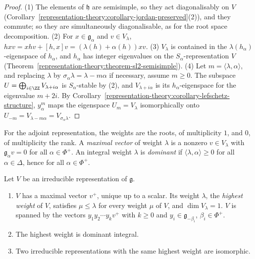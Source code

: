 \begin{proof}
(1) The elements of $\mathfrak{h}$ are semisimple, so they act diagonalisably on $V$ (Corollary~\ref{representation-theory:corollary-jordan-preserved}(2)), and they commute; so they
are simultaneously diagonalisable, as for the root space decomposition. (2) For $x \in \mathfrak{g}_\alpha$ and $v \in V_\lambda$, $hxv = xhv + [h, x]v = (\lambda(h) + \alpha(h))xv$.
(3) $V_\lambda$ is contained in the $\lambda(h_\alpha)$-eigenspace of $h_\alpha$, and $h_\alpha$ has integer eigenvalues on the $S_\alpha$-representation $V$
(Theorem~\ref{representation-theory:theorem-sl2-semisimple}). (4) Let $m = \langle\lambda, \alpha\rangle$, and replacing $\lambda$ by $\sigma_\alpha\lambda = \lambda - m\alpha$ if necessary,
assume $m \geq 0$. The subspace $U = \bigoplus_{i \in \ZZ}V_{\lambda + i\alpha}$ is $S_\alpha$-stable by (2), and $V_{\lambda + i\alpha}$ is its $h_\alpha$-eigenspace for the eigenvalue
$m + 2i$. By Corollary~\ref{representation-theory:corollary-lefschetz-structure}, $y_\alpha^m$ maps the eigenspace $U_m = V_\lambda$ isomorphically onto $U_{-m} = V_{\lambda - m\alpha} =
V_{\sigma_\alpha\lambda}$.
\end{proof}

For the adjoint representation, the weights are the roots, of multiplicity $1$, and $0$, of multiplicity the rank. A \emph{maximal vector} of weight $\lambda$ is a nonzero $v \in V_\lambda$ with
$\mathfrak{g}_\alpha v = 0$ for all $\alpha \in \Phi^+$. An integral weight $\lambda$ is \emph{dominant} if $\langle\lambda, \alpha\rangle \geq 0$ for all $\alpha \in \Delta$, hence for all
$\alpha \in \Phi^+$.

\begin{theorem}\label{representation-theory:theorem-highest-weight}
Let $V$ be an irreducible representation of $\mathfrak{g}$.
\begin{enumerate}
\item $V$ has a maximal vector $v^+$, unique up to a scalar. Its weight $\lambda$, the \emph{highest weight} of $V$, satisfies $\mu \leq \lambda$ for every weight $\mu$ of $V$, and
$\dim V_\lambda = 1$. $V$ is spanned by the vectors $y_1y_2\cdots y_kv^+$ with $k \geq 0$ and $y_i \in \mathfrak{g}_{-\beta_i}$, $\beta_i \in \Phi^+$.
\item The highest weight is dominant integral.
\item Two irreducible representations with the same highest weight are isomorphic.
\end{enumerate}
\end{theorem}

